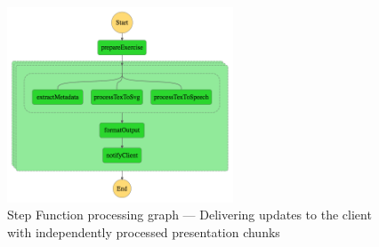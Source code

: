 \begin{figure}[]
    \centering
    \includegraphics[width=0.6\textwidth]{assets/04-serverless-for-web-apps/stepFunctionGraphInitialBatch.png}
    \caption{Step Function processing graph --- Delivering updates to the client with independently processed presentation chunks}
    \label{fig:step-function-pushing-updates-to-the-client-with-partially-processed-presentation}
\end{figure}

\datasetUploadInitialBatch

